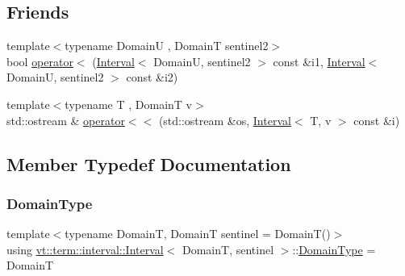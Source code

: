 \subsection*{Friends}
\begin{DoxyCompactItemize}
\item 
{\footnotesize template$<$typename DomainU , DomainT sentinel2$>$ }\\bool \hyperlink{structvt_1_1term_1_1interval_1_1_interval_ac749dc791f49126328a9a8c69e282e5f}{operator$<$} (\hyperlink{structvt_1_1term_1_1interval_1_1_interval}{Interval}$<$ DomainU, sentinel2 $>$ const \&i1, \hyperlink{structvt_1_1term_1_1interval_1_1_interval}{Interval}$<$ DomainU, sentinel2 $>$ const \&i2)
\item 
{\footnotesize template$<$typename T , DomainT v$>$ }\\std\+::ostream \& \hyperlink{structvt_1_1term_1_1interval_1_1_interval_a764fa3f5ff6c49067c4c36a35b498c8b}{operator$<$$<$} (std\+::ostream \&os, \hyperlink{structvt_1_1term_1_1interval_1_1_interval}{Interval}$<$ T, v $>$ const \&i)
\end{DoxyCompactItemize}


\subsection{Member Typedef Documentation}
\mbox{\label{structvt_1_1term_1_1interval_1_1_interval_a237ccc9805d839c82151945ad80b796c}} 
\subsubsection{\texorpdfstring{Domain\+Type}{DomainType}}
{\footnotesize\ttfamily template$<$typename DomainT, DomainT sentinel = Domain\+T()$>$ \\
using \hyperlink{structvt_1_1term_1_1interval_1_1_interval}{vt\+::term\+::interval\+::\+Interval}$<$ DomainT, sentinel $>$\+::\hyperlink{structvt_1_1term_1_1interval_1_1_interval_a237ccc9805d839c82151945ad80b796c}{Domain\+Type} =  DomainT}

\mbox{\label{structvt_1_1term_1_1interval_1_1_interval_a183b53c7344a9aa51c026dfe71b57ad4}} 
